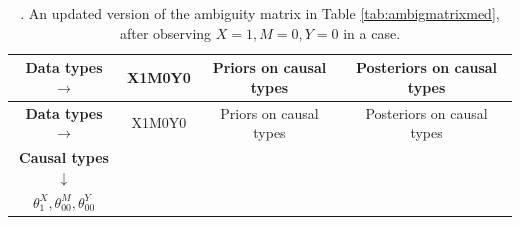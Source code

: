 \documentclass[12pt,]{book}
\begin{document}
\begin{longtable}[]{@{}cccc@{}}
\caption{\label{tab:ambigmedupdate}. An updated version of the ambiguity matrix in Table \ref{tab:ambigmatrixmed}, after observing \(X=1, M=0, Y=0\) in a case.}\tabularnewline
\toprule
\begin{minipage}[b]{0.36\columnwidth}\centering
\textbf{Data types} \(\rightarrow\)\strut
\end{minipage} & \begin{minipage}[b]{0.07\columnwidth}\centering
X1M0Y0\strut
\end{minipage} & \begin{minipage}[b]{0.21\columnwidth}\centering
Priors on causal types\strut
\end{minipage} & \begin{minipage}[b]{0.25\columnwidth}\centering
Posteriors on causal types\strut
\end{minipage}\tabularnewline
\midrule
\endfirsthead
\toprule
\begin{minipage}[b]{0.36\columnwidth}\centering
\textbf{Data types} \(\rightarrow\)\strut
\end{minipage} & \begin{minipage}[b]{0.07\columnwidth}\centering
X1M0Y0\strut
\end{minipage} & \begin{minipage}[b]{0.21\columnwidth}\centering
Priors on causal types\strut
\end{minipage} & \begin{minipage}[b]{0.25\columnwidth}\centering
Posteriors on causal types\strut
\end{minipage}\tabularnewline
\midrule
\endhead
\begin{minipage}[t]{0.36\columnwidth}\centering
\textbf{Causal types} \(\downarrow\)\strut
\end{minipage} & \begin{minipage}[t]{0.07\columnwidth}\centering
\strut
\end{minipage} & \begin{minipage}[t]{0.21\columnwidth}\centering
\strut
\end{minipage} & \begin{minipage}[t]{0.25\columnwidth}\centering
\strut
\end{minipage}\tabularnewline
\begin{minipage}[t]{0.36\columnwidth}\centering
\(\theta^X_1,\theta^M_{00},\theta^Y_{00}\)\strut
\end{minipage} & \begin{minipage}[t]{0.07\columnwidth}\centering

\end{minipage}
\end{longtable}
\end{document}
